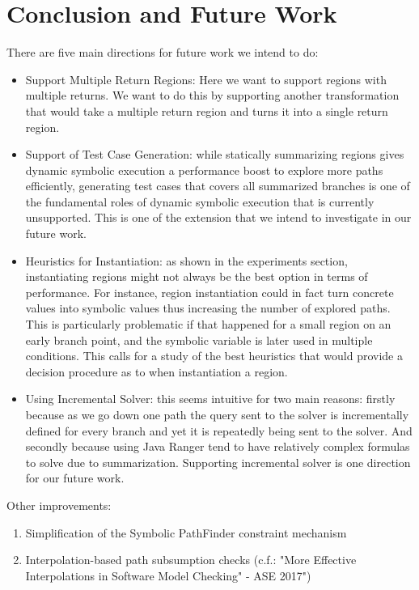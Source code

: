 \section{Conclusion and Future Work}
\label{sec:future}

There are five main directions for future work we intend to do:
\begin{itemize}
\item Support Multiple Return Regions:  Here we want to support regions with multiple returns. 
%
We want to do this by supporting another transformation that would take a multiple return region and turns it into a single return region. 

\item Support of Test Case Generation: while statically summarizing regions gives dynamic symbolic execution a performance boost to explore more paths efficiently, generating test cases that covers all summarized branches is one of the fundamental roles of dynamic symbolic execution that is currently unsupported. 
%
This is one of the extension that we intend to investigate in our future work. 
%

\item Heuristics for Instantiation: as shown in the experiments section, instantiating regions might not always be the best option in terms of performance.
%
For instance, region instantiation could in fact turn concrete values into symbolic values thus increasing the number of explored paths. 
%
This is particularly problematic if that happened for a small region on an early branch point, and the symbolic variable is later used in multiple conditions.
%
This calls for a study of the best heuristics that would provide a decision procedure as to when instantiation a region.

\item Using Incremental Solver: this seems intuitive for two main reasons: firstly because as we go down one path the query sent to the solver is incrementally defined for every branch and yet it is repeatedly being sent to the solver. 
%
And secondly because using Java Ranger tend to have relatively complex formulas to solve due to summarization. 
%
Supporting incremental solver is one direction for our future work. 
\end{itemize}



Other improvements:
\begin{enumerate}
\item Simplification of the Symbolic PathFinder constraint mechanism

\item Interpolation-based path subsumption checks  (c.f.: "More Effective Interpolations in Software Model Checking" - ASE 2017")

\end{enumerate}


